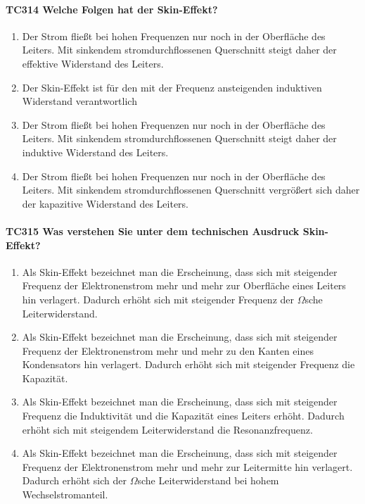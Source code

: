 \documentclass[8pt]{article}
\begin{document}
\begin{enumerate}
\begin{enumerate}[nolistsep,label=\Alph*]
{\paragraph*{TC314 Welche Folgen hat der Skin-Effekt?}
\begin{enumerate}[nolistsep,label=\Alph*]
\item Der Strom fließt bei hohen Frequenzen nur noch in der Oberfläche des Leiters. Mit sinkendem stromdurchflossenen Querschnitt steigt daher der effektive Widerstand des Leiters.
\item Der Skin-Effekt ist für den mit der Frequenz ansteigenden induktiven Widerstand verantwortlich 
\item Der Strom fließt bei hohen Frequenzen nur noch in der Oberfläche des Leiters. Mit sinkendem stromdurchflossenen Querschnitt steigt daher der induktive Widerstand des Leiters.
\item Der Strom fließt bei hohen Frequenzen nur noch in der Oberfläche des Leiters. Mit sinkendem stromdurchflossenen Querschnitt vergrößert sich daher der kapazitive Widerstand des Leiters.
\end{enumerate}

\paragraph*{TC315 Was verstehen Sie unter dem technischen Ausdruck Skin-Effekt?}
\begin{enumerate}[nolistsep,label=\Alph*]
\item Als Skin-Effekt bezeichnet man die Erscheinung, dass sich mit steigender Frequenz der Elektronenstrom mehr und mehr zur Oberfläche eines Leiters hin verlagert. Dadurch erhöht sich mit steigender Frequenz der $\Omega$sche Leiterwiderstand.
\item Als Skin-Effekt bezeichnet man die Erscheinung, dass sich mit steigender Frequenz der Elektronenstrom mehr und mehr zu den Kanten eines Kondensators hin verlagert. Dadurch erhöht sich mit steigender Frequenz die Kapazität. 
\item Als Skin-Effekt bezeichnet man die Erscheinung, dass sich mit steigender Frequenz die Induktivität und die Kapazität eines Leiters erhöht. Dadurch erhöht sich mit steigendem Leiterwiderstand die Resonanzfrequenz.
\item Als Skin-Effekt bezeichnet man die Erscheinung, dass sich mit steigender Frequenz der Elektronenstrom mehr und mehr zur Leitermitte hin verlagert. Dadurch erhöht sich der $\Omega$sche Leiterwiderstand bei hohem Wechselstromanteil.
\end{enumerate}

}
\end{enumerate}
\end{enumerate}
\end{document}
